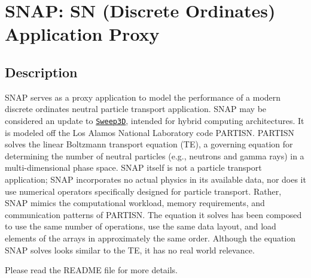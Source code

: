 \section*{S\-N\-A\-P\-: S\-N (Discrete Ordinates) Application Proxy}

\subsection*{Description}

S\-N\-A\-P serves as a proxy application to model the performance of a modern discrete ordinates neutral particle transport application. S\-N\-A\-P may be considered an update to \href{http://www.ccs3.lanl.gov/PAL/software.shtml}{\tt Sweep3\-D}, intended for hybrid computing architectures. It is modeled off the Los Alamos National Laboratory code P\-A\-R\-T\-I\-S\-N. P\-A\-R\-T\-I\-S\-N solves the linear Boltzmann transport equation (T\-E), a governing equation for determining the number of neutral particles (e.\-g., neutrons and gamma rays) in a multi-\/dimensional phase space. S\-N\-A\-P itself is not a particle transport application; S\-N\-A\-P incorporates no actual physics in its available data, nor does it use numerical operators specifically designed for particle transport. Rather, S\-N\-A\-P mimics the computational workload, memory requirements, and communication patterns of P\-A\-R\-T\-I\-S\-N. The equation it solves has been composed to use the same number of operations, use the same data layout, and load elements of the arrays in approximately the same order. Although the equation S\-N\-A\-P solves looks similar to the T\-E, it has no real world relevance.

Please read the R\-E\-A\-D\-M\-E file for more details. 